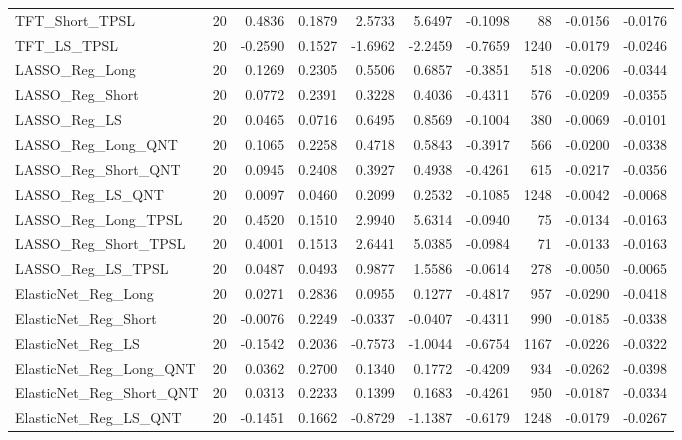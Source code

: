 \begin{tabular}{llrrrrrrrr}
\cline{1-10}
TFT\_Short\_TPSL & 20 & 0.4836 & 0.1879 & 2.5733 & 5.6497 & -0.1098 & 88 & -0.0156 & -0.0176 \\
\cline{1-10}
TFT\_LS\_TPSL & 20 & -0.2590 & 0.1527 & -1.6962 & -2.2459 & -0.7659 & 1240 & -0.0179 & -0.0246 \\
\cline{1-10}
LASSO\_Reg\_Long & 20 & 0.1269 & 0.2305 & 0.5506 & 0.6857 & -0.3851 & 518 & -0.0206 & -0.0344 \\
\cline{1-10}
LASSO\_Reg\_Short & 20 & 0.0772 & 0.2391 & 0.3228 & 0.4036 & -0.4311 & 576 & -0.0209 & -0.0355 \\
\cline{1-10}
LASSO\_Reg\_LS & 20 & 0.0465 & 0.0716 & 0.6495 & 0.8569 & -0.1004 & 380 & -0.0069 & -0.0101 \\
\cline{1-10}
LASSO\_Reg\_Long\_QNT & 20 & 0.1065 & 0.2258 & 0.4718 & 0.5843 & -0.3917 & 566 & -0.0200 & -0.0338 \\
\cline{1-10}
LASSO\_Reg\_Short\_QNT & 20 & 0.0945 & 0.2408 & 0.3927 & 0.4938 & -0.4261 & 615 & -0.0217 & -0.0356 \\
\cline{1-10}
LASSO\_Reg\_LS\_QNT & 20 & 0.0097 & 0.0460 & 0.2099 & 0.2532 & -0.1085 & 1248 & -0.0042 & -0.0068 \\
\cline{1-10}
LASSO\_Reg\_Long\_TPSL & 20 & 0.4520 & 0.1510 & 2.9940 & 5.6314 & -0.0940 & 75 & -0.0134 & -0.0163 \\
\cline{1-10}
LASSO\_Reg\_Short\_TPSL & 20 & 0.4001 & 0.1513 & 2.6441 & 5.0385 & -0.0984 & 71 & -0.0133 & -0.0163 \\
\cline{1-10}
LASSO\_Reg\_LS\_TPSL & 20 & 0.0487 & 0.0493 & 0.9877 & 1.5586 & -0.0614 & 278 & -0.0050 & -0.0065 \\
\cline{1-10}
ElasticNet\_Reg\_Long & 20 & 0.0271 & 0.2836 & 0.0955 & 0.1277 & -0.4817 & 957 & -0.0290 & -0.0418 \\
\cline{1-10}
ElasticNet\_Reg\_Short & 20 & -0.0076 & 0.2249 & -0.0337 & -0.0407 & -0.4311 & 990 & -0.0185 & -0.0338 \\
\cline{1-10}
ElasticNet\_Reg\_LS & 20 & -0.1542 & 0.2036 & -0.7573 & -1.0044 & -0.6754 & 1167 & -0.0226 & -0.0322 \\
\cline{1-10}
ElasticNet\_Reg\_Long\_QNT & 20 & 0.0362 & 0.2700 & 0.1340 & 0.1772 & -0.4209 & 934 & -0.0262 & -0.0398 \\
\cline{1-10}
ElasticNet\_Reg\_Short\_QNT & 20 & 0.0313 & 0.2233 & 0.1399 & 0.1683 & -0.4261 & 950 & -0.0187 & -0.0334 \\
\cline{1-10}
ElasticNet\_Reg\_LS\_QNT & 20 & -0.1451 & 0.1662 & -0.8729 & -1.1387 & -0.6179 & 1248 & -0.0179 & -0.0267 \\

\end{tabular}
